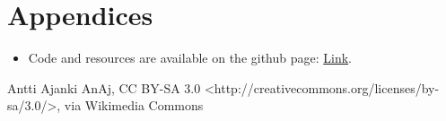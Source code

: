 \documentclass[12pt, a4paper]{report}
\begin{document}

    \newpage

    \section{Appendices}
    \begin{itemize}
      \item Code and resources are available on the github page: \href{}{Link}.
    \end{itemize}

    \newpage

    \begin{thebibliography}{9}
      Antti Ajanki AnAj, CC BY-SA 3.0 <http://creativecommons.org/licenses/by-sa/3.0/>, via Wikimedia Commons
      
    \end{thebibliography}
\end{document}
